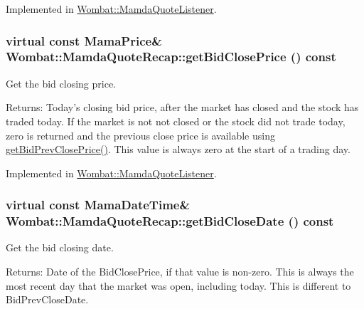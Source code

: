 Implemented in \hyperlink{classWombat_1_1MamdaQuoteListener_0256d6b1b2181919a00cf6d6e903b014}{Wombat::Mamda\-Quote\-Listener}.\hypertarget{classWombat_1_1MamdaQuoteRecap_c3fc3c06bdaeed7bb72169c5a27c31b2}{
\subsubsection[getBidClosePrice]{\setlength{\rightskip}{0pt plus 5cm}virtual const Mama\-Price\& Wombat::Mamda\-Quote\-Recap::get\-Bid\-Close\-Price () const}}
\label{classWombat_1_1MamdaQuoteRecap_c3fc3c06bdaeed7bb72169c5a27c31b2}


Get the bid closing price. 

\begin{Desc}
\item[Returns:]Today's closing bid price, after the market has closed and the stock has traded today. If the market is not not closed or the stock did not trade today, zero is returned and the previous close price is available using \hyperlink{classWombat_1_1MamdaQuoteRecap_5a0ba795de4b02302093d082484030f8}{get\-Bid\-Prev\-Close\-Price()}. This value is always zero at the start of a trading day. \end{Desc}


Implemented in \hyperlink{classWombat_1_1MamdaQuoteListener_0c5bde1b3a4bfafdaef20c99c0c63c07}{Wombat::Mamda\-Quote\-Listener}.\hypertarget{classWombat_1_1MamdaQuoteRecap_fe853f4d35ca2a5c464110529c97c20f}{
\subsubsection[getBidCloseDate]{\setlength{\rightskip}{0pt plus 5cm}virtual const Mama\-Date\-Time\& Wombat::Mamda\-Quote\-Recap::get\-Bid\-Close\-Date () const}}
\label{classWombat_1_1MamdaQuoteRecap_fe853f4d35ca2a5c464110529c97c20f}


Get the bid closing date. 

\begin{Desc}
\item[Returns:]Date of the Bid\-Close\-Price, if that value is non-zero. This is always the most recent day that the market was open, including today. This is different to Bid\-Prev\-Close\-Date. \end{Desc}


